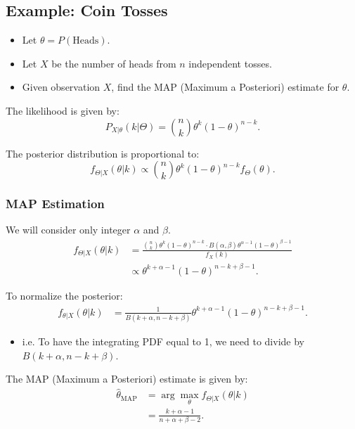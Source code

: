 \subsection{Example: Coin Tosses}
\begin{example}
    \begin{itemize}
        \item Let $\theta = P(\text{Heads})$.
        \item Let $X$ be the number of heads from $n$ independent tosses.
        \item Given observation $X$, find the MAP (Maximum a Posteriori) estimate for $\theta$.
    \end{itemize}
    
    The likelihood is given by:
    \[
    P_{X|\theta}(k | \Theta) = \binom{n}{k} \theta^k (1 - \theta)^{n-k}.
    \]
    
    The posterior distribution is proportional to:
    \[
    f_{\Theta|X}(\theta | k) \propto \binom{n}{k} \theta^k (1 - \theta)^{n-k} f_\Theta(\theta).
    \]
\end{example}

\subsubsection{MAP Estimation}
\begin{example} We will consider only integer $\alpha$ and $\beta$.
    \begin{align*}
    f_{\Theta|X}(\theta | k) &= \frac{\binom{n}{k} \theta^k (1-\theta)^{n-k} \cdot B(\alpha, \beta) \theta^{\alpha-1} (1-\theta)^{\beta-1}}{f_X(k)} \\
    &\propto \theta^{k+\alpha-1} (1-\theta)^{n-k+\beta-1}.
    \end{align*}
    
    To normalize the posterior:
    \begin{align*}
    f_{\theta|X}(\theta | k) &= \frac{1}{B(k+\alpha, n-k+\beta)} \theta^{k+\alpha-1} (1-\theta)^{n-k+\beta-1}.
    \end{align*}
    \begin{itemize}
        \item i.e. To have the integrating PDF equal to 1, we need to divide by $B(k+\alpha, n-k+\beta)$.
    \end{itemize}
    
    The MAP (Maximum a Posteriori) estimate is given by:
    \begin{align*}
    \hat{\theta}_{\text{MAP}} &= \arg\max_{\theta} f_{\Theta|X}(\theta | k) \\
    &= \frac{k + \alpha - 1}{n + \alpha + \beta - 2}.
    \end{align*}  
\end{example}

